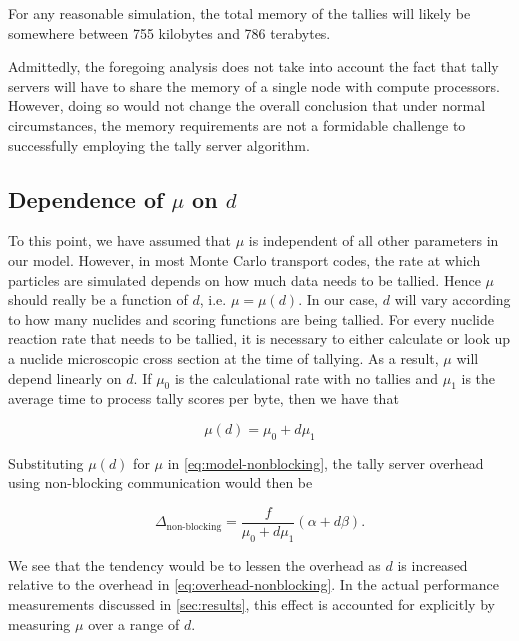 \noindent For any reasonable simulation, the total memory of the tallies will
likely be somewhere between 755 kilobytes and 786 terabytes.

Admittedly, the foregoing analysis does not take into account the fact that
tally servers will have to share the memory of a single node with compute
processors. However, doing so would not change the overall conclusion that under
normal circumstances, the memory requirements are not a formidable challenge to
successfully employing the tally server algorithm.

\subsection{Dependence of \texorpdfstring{$\mu$ on $d$}{u on d}}

To this point, we have assumed that $\mu$ is independent of all other parameters
in our model. However, in most Monte Carlo transport codes, the rate at which
particles are simulated depends on how much data needs to be tallied. Hence
$\mu$ should really be a function of $d$, i.e. $\mu = \mu(d)$. In our case, $d$
will vary according to how many nuclides and scoring functions are being
tallied. For every nuclide reaction rate that needs to be tallied, it is
necessary to either calculate or look up a nuclide microscopic cross section at
the time of tallying. As a result, $\mu$ will depend linearly on $d$. If $\mu_0$
is the calculational rate with no tallies and $\mu_1$ is the average time to
process tally scores per byte, then we have that

\begin{equation}
  \label{eq:mu-function}
  \mu(d) = \mu_0 + d\mu_1
\end{equation}

\noindent Substituting $\mu(d)$ for $\mu$ in \eqref{eq:model-nonblocking}, the
tally server overhead using non-blocking communication would then be

\begin{equation}
  \label{eq:model-blocking-mud}
  \Delta_{\text{non-blocking}} = \frac{f}{\mu_0 + d\mu_1} \left ( \alpha + d\beta
    \right ).
\end{equation}

\noindent We see that the tendency would be to lessen the overhead as $d$ is
increased relative to the overhead in \eqref{eq:overhead-nonblocking}. In the
actual performance measurements discussed in \autoref{sec:results}, this effect
is accounted for explicitly by measuring $\mu$ over a range of $d$.

